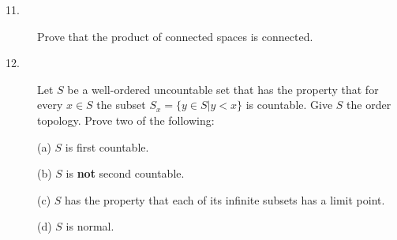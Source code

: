 \documentclass{article}
\begin{document}
\begin{description}
\item[11.]
Prove that the product of connected spaces is connected.

\item[12.]
Let $S$ be a well-ordered uncountable set that has the property that for
every $x \in S$ the subset
$S_x = \{y \in S | y< x\}$ is countable. Give $S$ the order topology. Prove
two of the following:

\item[\quad] (a)
$S$ is first countable.

\item[\quad] (b)
$S$ is {\bf not} second countable.

\item[\quad] (c)
$S$ has the property that each of its infinite subsets has a limit point.

\item[\quad] (d)
$S$ is normal.



\end{description}    
\end{document}
